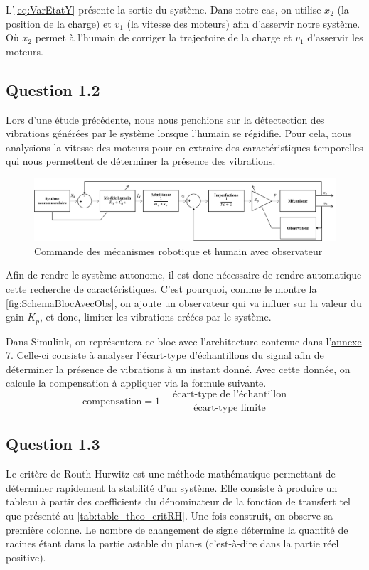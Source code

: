 \documentclass[a4paper,12pt]{article}
\begin{document}
    L'\autoref{eq:VarEtatY} présente la sortie du système. Dans notre cas, on utilise $x_2$ (la position de la charge) et $v_1$ (la vitesse des moteurs) afin d'asservir notre système. Où $x_2$ permet à l'humain de corriger la trajectoire de la charge et $v_1$ d'asservir les moteurs.
    
    
    \subsection{Question 1.2}
    Lors d'une étude précédente, nous nous penchions sur la détectection des vibrations générées par le système lorsque l'humain se régidifie. Pour cela, nous analysions la vitesse des moteurs pour en extraire des caractéristiques temporelles qui nous permettent de déterminer la présence des vibrations.   
    \begin{figure}[H]
        \centering
        \includegraphics[width=16cm]{./img/SchemaBlocAvecObs.png}
        \caption{Commande des mécanismes robotique et humain avec observateur\label{fig:SchemaBlocAvecObs}}
    \end{figure}
    
    Afin de rendre le système autonome, il est donc nécessaire de rendre automatique cette recherche de caractéristiques. C'est pourquoi, comme le montre la \autoref{fig:SchemaBlocAvecObs}, on ajoute un observateur qui va influer sur la valeur du gain $K_p$, et donc, limiter les vibrations créées par le système.
    
    Dans Simulink, on représentera ce bloc avec l’architecture contenue dans l'\hyperref[Annexe:modelObs]{annexe 7}. Celle-ci consiste à analyser l’écart-type d'échantillons du signal afin de déterminer la présence de vibrations à un instant donné. Avec cette donnée, on calcule la compensation à appliquer via la formule suivante.
    \begin{equation}
        \text{compensation} = 1 - \frac{\text{écart-type de l'échantillon}}{\text{écart-type limite}}
    \end{equation}
    
    
    \subsection{Question 1.3}
    Le critère de Routh-Hurwitz est une méthode mathématique permettant de déterminer rapidement la stabilité d'un système. Elle consiste à produire un tableau à partir des coefficients du dénominateur de la fonction de transfert tel que présenté au \autoref{tab:table_theo_critRH}. Une fois construit, on observe sa première colonne. Le nombre de changement de signe détermine la quantité de racines étant dans la partie astable du plan-s (c'est-à-dire dans la partie réel positive).
    
\end{document}
